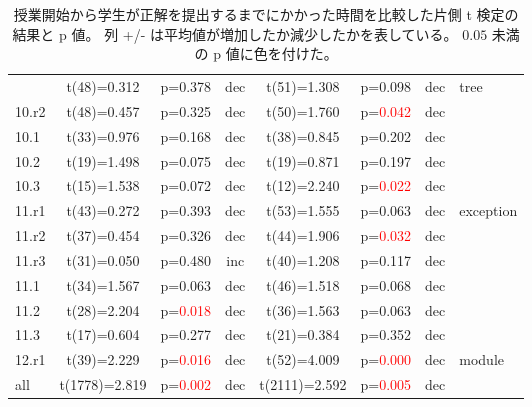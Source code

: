 \begin{table}
\begin{center}
\begin{tabular}{|l||c|c|c||c|c|c||l|}
    & t(48)=0.312 & p=0.378 & dec
    & t(51)=1.308 & p=0.098 & dec
    & tree\\ \cline{1-7}
    10.r2
    & t(48)=0.457 & p=0.325 & dec
    & t(50)=1.760 & p=\textcolor{red}{0.042} & dec
    & \\ \cline{1-7}
    10.1
    & t(33)=0.976 & p=0.168 & dec
    & t(38)=0.845 & p=0.202 & dec
    & \\ \cline{1-7}
    10.2
    & t(19)=1.498 & p=0.075 & dec
    & t(19)=0.871 & p=0.197 & dec
    & \\ \cline{1-7}
    10.3
    & t(15)=1.538 & p=0.072 & dec
    & t(12)=2.240 & p=\textcolor{red}{0.022} & dec
    & \\ \hline
    11.r1
    & t(43)=0.272 & p=0.393 & dec
    & t(53)=1.555 & p=0.063 & dec
    & exception\\ \cline{1-7}
    11.r2
    & t(37)=0.454 & p=0.326 & dec
    & t(44)=1.906 & p=\textcolor{red}{0.032} & dec
    & \\ \cline{1-7}
    11.r3
    & t(31)=0.050 & p=0.480 & inc
    & t(40)=1.208 & p=0.117 & dec
    & \\ \cline{1-7}
    11.1
    & t(34)=1.567 & p=0.063 & dec
    & t(46)=1.518 & p=0.068 & dec
    & \\ \cline{1-7}
    11.2
    & t(28)=2.204 & p=\textcolor{red}{0.018} & dec
    & t(36)=1.563 & p=0.063 & dec
    & \\ \cline{1-7}
    11.3
    & t(17)=0.604 & p=0.277 & dec
    & t(21)=0.384 & p=0.352 & dec
    & \\ \hline
    12.r1
    & t(39)=2.229 & p=\textcolor{red}{0.016} & dec
    & t(52)=4.009 & p=\textcolor{red}{0.000} & dec
    & module\\ \hline
    all
    & t(1778)=2.819 & p=\textcolor{red}{0.002} & dec
    & t(2111)=2.592 & p=\textcolor{red}{0.005} & dec
    & \\ \hline
  \end{tabular}
  \end{center}
  \caption[拡張されたステッパを利用した年と他の年の学生が正答するまでの時間の比較]{
    授業開始から学生が正解を提出するまでにかかった時間を比較した片側 t 検定の結果と p 値。
    列 +/- は平均値が増加したか減少したかを表している。
    $0.05$ 未満の p 値に色を付けた。
  } 
  \label{TableTTest}
\end{table}
